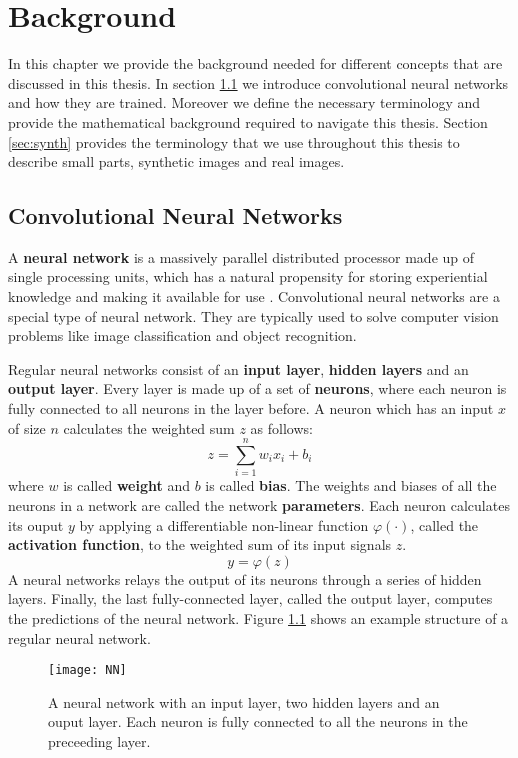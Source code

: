 \chapter{Background}\label{ch:background}
In this chapter we provide the background needed for different concepts that are discussed in this thesis. In section \ref{sec:cnn} we introduce convolutional neural networks and how they are trained. Moreover we define the necessary terminology and provide the mathematical background required to navigate this thesis. Section \ref{sec:synth} provides the terminology that we use throughout this thesis to describe small parts, synthetic images and real images.


\section{Convolutional Neural Networks}\label{sec:cnn}
A \textbf{neural network} is a massively parallel distributed processor made up of single processing units, which has a natural propensity for storing experiential knowledge and making it available for use \cite{haykin1994neural}. Convolutional neural networks are a special type of neural network. They are typically used to solve computer vision problems like image classification and object recognition.

Regular neural networks consist of an \textbf{input layer}, \textbf{hidden layers} and an \textbf{output layer}. Every layer is made up of a set of \textbf{neurons}, where each neuron is fully connected to all neurons in the layer before. A neuron which has an input $x$ of size $n$ calculates the weighted sum $z$ as follows: \[ z = \sum_{i=1}^n w_ix_i + b_i \] where $w$ is called \textbf{weight} and $b$ is called \textbf{bias}. The weights and biases of all the neurons in a network are called the network \textbf{parameters}. Each neuron calculates its ouput $y$ by applying a differentiable non-linear function $\varphi(\cdot)$, called the \textbf{activation function}, to the weighted sum of its input signals $z$. \[y = \varphi(z)\] A neural networks relays the output of its neurons through a series of hidden layers. Finally, the last fully-connected layer, called the output layer, computes the predictions of the neural network. Figure \ref{fig:NN} shows an example structure of a regular neural network.

\begin{figure}[H]
\centering
\texttt{[image: NN]}
\caption[A neural network with an input layer, two hidden layers and an ouput layer. Each neuron is fully connected to all the neurons in the preceeding layer.]{A neural network with an input layer, two hidden layers and an ouput layer. Each neuron is fully connected to all the neurons in the preceeding layer.\footnotemark}
\label{fig:NN}
\end{figure}

